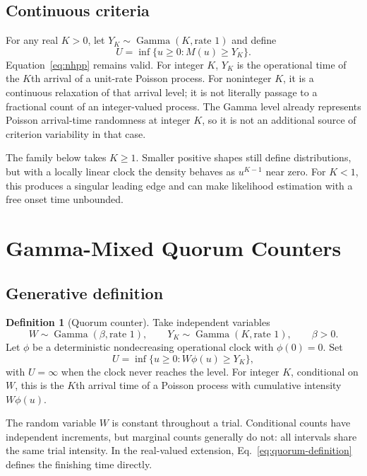 \documentclass[12pt]{article}
\newcommand{\GammaDist}{\operatorname{Gamma}}
\theoremstyle{definition}
\newtheorem{definition}{Definition}
\theoremstyle{plain}
\theoremstyle{remark}
\begin{document}
\subsection{Continuous criteria}
For any real $K>0$, let $Y_K\sim\GammaDist(K,\text{rate }1)$ and define
\begin{equation}
 U=\inf\{u\geq0:M(u)\geq Y_K\}.\label{eq:gamma-threshold}
\end{equation}
Equation~\eqref{eq:nhpp} remains valid. For integer $K$, $Y_K$ is the operational time of the $K$th arrival of a unit-rate Poisson process. For noninteger $K$, it is a continuous relaxation of that arrival level; it is not literally passage to a fractional count of an integer-valued process. The Gamma level already represents Poisson arrival-time randomness at integer $K$, so it is not an additional source of criterion variability in that case.

The family below takes $K\geq1$. Smaller positive shapes still define distributions, but with a locally linear clock the density behaves as $u^{K-1}$ near zero. For $K<1$, this produces a singular leading edge and can make likelihood estimation with a free onset time unbounded.

\section{Gamma-Mixed Quorum Counters}\label{sec:quorum}

\subsection{Generative definition}
\begin{definition}[Quorum counter]
Take independent variables
\begin{equation}
 W\sim\GammaDist(\beta,\text{rate }1),\qquad
 Y_K\sim\GammaDist(K,\text{rate }1),\qquad \beta>0.
\end{equation}
Let $\phi$ be a deterministic nondecreasing operational clock with $\phi(0)=0$. Set
\begin{equation}
 U=\inf\{u\geq0:W\phi(u)\geq Y_K\},\label{eq:quorum-definition}
\end{equation}
with $U=\infty$ when the clock never reaches the level. For integer $K$, conditional on $W$, this is the $K$th arrival time of a Poisson process with cumulative intensity $W\phi(u)$.
\end{definition}
The random variable $W$ is constant throughout a trial. Conditional counts have independent increments, but marginal counts generally do not: all intervals share the same trial intensity. In the real-valued extension, Eq.~\eqref{eq:quorum-definition} defines the finishing time directly.
\end{document}

